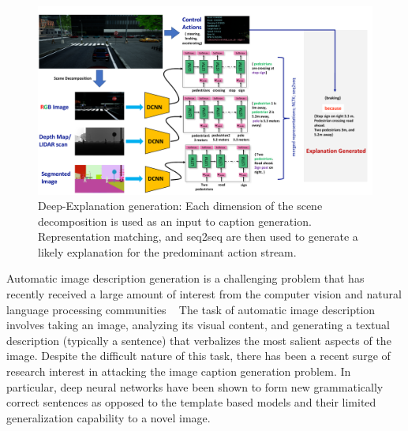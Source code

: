 
\begin{figure}
    \centering
    \includegraphics[width=0.75\columnwidth]{figures/deep_exp.pdf}
    \caption{Deep-Explanation generation: Each dimension of the scene decomposition is used as an input to caption generation. Representation matching, and seq2seq are then used to generate a likely explanation for the predominant action stream.  }
    \label{fig:deep_exp}
\end{figure}

Automatic image description generation is a challenging problem that has recently received a large amount of interest from the computer vision and natural language processing communities ~\cite{johnson2016densecap, xu2015show, wang2016image, karpathy2015deep,Vinyals2015ShowAT}
The task of automatic image description involves taking an image, analyzing its visual content, and generating a textual description (typically a sentence) that verbalizes the most salient aspects of the image. 
Despite the difficult nature of this task, there has been a recent surge of research interest in attacking the image caption generation problem. In particular, deep neural networks have been shown to form new grammatically correct sentences as opposed to the template based models and their limited generalization capability to a novel image.


